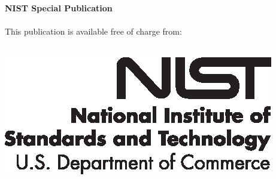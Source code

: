 	\begin{titlepage}
		\begin{flushright}
        \LARGE{\textbf{NIST Special Publication \pubnumber}}\\
        \vfill
        \Huge{\textbf{\TITLE}}\\
        \vfill
        \AUTHORS
        \normalsize This publication is available free of charge from:\\
        \DOI\\
        \vfill

        \includegraphics[width=0.3\linewidth]{format/NIST-logo.eps}\\ 

        \end{flushright}
    \end{titlepage}

